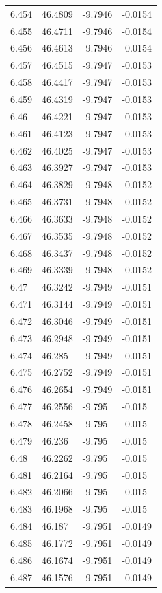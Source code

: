 \begin{tabular}{llll}
6.454 & 46.4809 & -9.7946 & -0.0154 \\
6.455 & 46.4711 & -9.7946 & -0.0154 \\
6.456 & 46.4613 & -9.7946 & -0.0154 \\
6.457 & 46.4515 & -9.7947 & -0.0153 \\
6.458 & 46.4417 & -9.7947 & -0.0153 \\
6.459 & 46.4319 & -9.7947 & -0.0153 \\
6.46 & 46.4221 & -9.7947 & -0.0153 \\
6.461 & 46.4123 & -9.7947 & -0.0153 \\
6.462 & 46.4025 & -9.7947 & -0.0153 \\
6.463 & 46.3927 & -9.7947 & -0.0153 \\
6.464 & 46.3829 & -9.7948 & -0.0152 \\
6.465 & 46.3731 & -9.7948 & -0.0152 \\
6.466 & 46.3633 & -9.7948 & -0.0152 \\
6.467 & 46.3535 & -9.7948 & -0.0152 \\
6.468 & 46.3437 & -9.7948 & -0.0152 \\
6.469 & 46.3339 & -9.7948 & -0.0152 \\
6.47 & 46.3242 & -9.7949 & -0.0151 \\
6.471 & 46.3144 & -9.7949 & -0.0151 \\
6.472 & 46.3046 & -9.7949 & -0.0151 \\
6.473 & 46.2948 & -9.7949 & -0.0151 \\
6.474 & 46.285 & -9.7949 & -0.0151 \\
6.475 & 46.2752 & -9.7949 & -0.0151 \\
6.476 & 46.2654 & -9.7949 & -0.0151 \\
6.477 & 46.2556 & -9.795 & -0.015 \\
6.478 & 46.2458 & -9.795 & -0.015 \\
6.479 & 46.236 & -9.795 & -0.015 \\
6.48 & 46.2262 & -9.795 & -0.015 \\
6.481 & 46.2164 & -9.795 & -0.015 \\
6.482 & 46.2066 & -9.795 & -0.015 \\
6.483 & 46.1968 & -9.795 & -0.015 \\
6.484 & 46.187 & -9.7951 & -0.0149 \\
6.485 & 46.1772 & -9.7951 & -0.0149 \\
6.486 & 46.1674 & -9.7951 & -0.0149 \\
6.487 & 46.1576 & -9.7951 & -0.0149 \\

\end{tabular}
